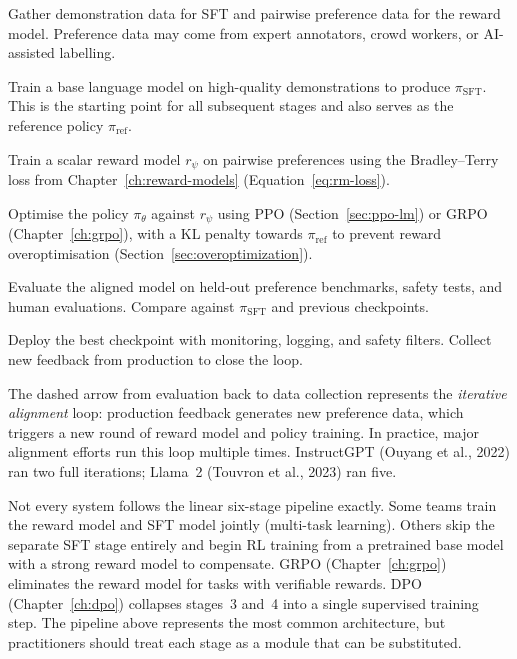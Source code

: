 \begin{description}[leftmargin=!,labelwidth=3.5cm]
  \item[Stage 1: Data collection] Gather demonstration data for SFT and pairwise preference data for the reward model. Preference data may come from expert annotators, crowd workers, or AI-assisted labelling.
  \item[Stage 2: Supervised fine-tuning] Train a base language model on high-quality demonstrations to produce $\pi_{\mathrm{SFT}}$. This is the starting point for all subsequent stages and also serves as the reference policy $\pi_{\mathrm{ref}}$.
  \item[Stage 3: Reward model training] Train a scalar reward model $r_\psi$ on pairwise preferences using the Bradley--Terry loss from Chapter~\ref{ch:reward-models} (Equation~\eqref{eq:rm-loss}).
  \item[Stage 4: RL training] Optimise the policy $\pi_\theta$ against $r_\psi$ using PPO (Section~\ref{sec:ppo-lm}) or GRPO (Chapter~\ref{ch:grpo}), with a KL penalty towards $\pi_{\mathrm{ref}}$ to prevent reward overoptimisation (Section~\ref{sec:overoptimization}).
  \item[Stage 5: Evaluation] Evaluate the aligned model on held-out preference benchmarks, safety tests, and human evaluations. Compare against $\pi_{\mathrm{SFT}}$ and previous checkpoints.
  \item[Stage 6: Deployment] Deploy the best checkpoint with monitoring, logging, and safety filters. Collect new feedback from production to close the loop.
\end{description}

The dashed arrow from evaluation back to data collection represents the \emph{iterative alignment} loop: production feedback generates new preference data, which triggers a new round of reward model and policy training. In practice, major alignment efforts run this loop multiple times. InstructGPT (Ouyang et al., 2022) ran two full iterations; Llama~2 (Touvron et al., 2023) ran five.

\begin{remark}
\label{rem:pipeline-variations}
Not every system follows the linear six-stage pipeline exactly. Some teams train the reward model and SFT model jointly (multi-task learning). Others skip the separate SFT stage entirely and begin RL training from a pretrained base model with a strong reward model to compensate. GRPO (Chapter~\ref{ch:grpo}) eliminates the reward model for tasks with verifiable rewards. DPO (Chapter~\ref{ch:dpo}) collapses stages~3 and~4 into a single supervised training step. The pipeline above represents the most common architecture, but practitioners should treat each stage as a module that can be substituted.
\end{remark}

